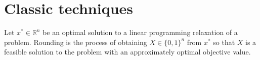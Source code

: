\section{Classic techniques}

Let $x^* \in \mathbb{R}^n$ be an optimal solution to
a linear programming relaxation of a problem.
Rounding is the process of obtaining $X \in \{0, 1\}^n$
from $x^*$ so that $X$ is a feasible solution to the problem
with an approximately optimal objective value.



